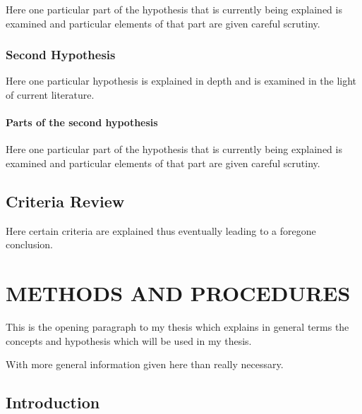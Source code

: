 \documentclass[11pt]{isuthesis}
\begin{document}
Here one particular part of the hypothesis that is 
currently being explained is examined and particular
elements of that part are given careful scrutiny.


\subsection{Second Hypothesis}

Here one particular hypothesis is explained in depth
and is examined in the light of current literature.

\subsubsection{Parts of the second hypothesis}

Here one particular part of the hypothesis that is 
currently being explained is examined and particular
elements of that part are given careful scrutiny.

\section{Criteria Review}

Here certain criteria are explained thus eventually
leading to a foregone conclusion.


\chapter{METHODS AND PROCEDURES}

This is the opening paragraph to my thesis which
explains in general terms the concepts and hypothesis
which will be used in my thesis.

With more general information given here than really
necessary.

\section{Introduction}
\end{document}
